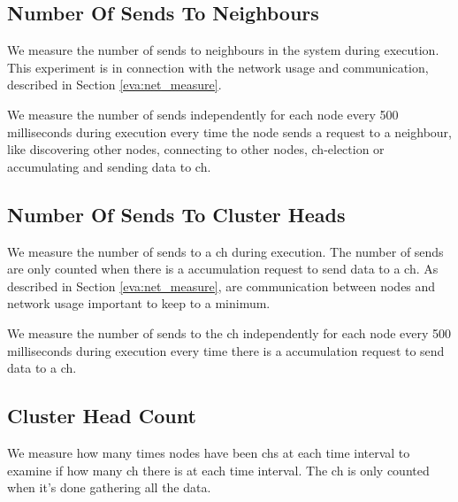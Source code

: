 \documentclass[USenglish]{uit-thesis}
\begin{document}
\subsection{Number Of Sends To Neighbours} \label{eva:num_sends}
We measure the number of sends to neighbours in the system during execution. This experiment is in connection with the network usage and communication, described in Section \ref{eva:net_measure}. 

We measure the number of sends independently for each node every 500 milliseconds during execution every time the node sends a request to a neighbour, like discovering other nodes, connecting to other nodes, \gls{ch}-election or accumulating and sending data to \gls{ch}.


\subsection{Number Of Sends To Cluster Heads} \label{eva:num_sends_ch}
We measure the number of sends to a \gls{ch} during execution. The number of sends are only counted when there is a accumulation request to send data to a \gls{ch}. As described in Section \ref{eva:net_measure}, are communication between nodes and network usage important to keep to a minimum.



We measure the number of sends to the \gls{ch} independently for each node every 500 milliseconds during execution every time there is a accumulation request to send data to a \gls{ch}.


\subsection{Cluster Head Count} \label{eva:ch_count}
We measure how many times nodes have been \glspl{ch} at each time interval to examine if how many \gls{ch} there is at each time interval. The \gls{ch} is only counted when it's done gathering all the data.
\end{document}

